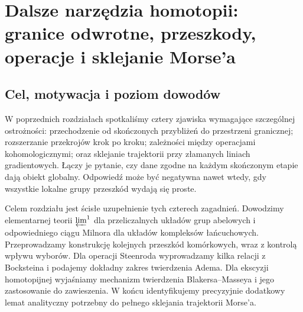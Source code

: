 \chapter{Dalsze narzędzia homotopii: granice odwrotne, przeszkody, operacje i sklejanie Morse'a}
\label{ch:xviii-domkniecie}

\section{Cel, motywacja i poziom dowodów}
W poprzednich rozdziałach spotkaliśmy cztery zjawiska wymagające
szczególnej ostrożności: przechodzenie od skończonych przybliżeń do
przestrzeni granicznej; rozszerzanie przekrojów krok po kroku; zależności
między operacjami kohomologicznymi; oraz sklejanie trajektorii przy
złamanych liniach gradientowych. Łączy je pytanie, czy dane zgodne na
każdym skończonym etapie dają obiekt globalny. Odpowiedź może być
negatywna nawet wtedy, gdy wszystkie lokalne grupy przeszkód wydają się
proste.

Celem rozdziału jest ścisłe uzupełnienie tych czterech zagadnień.
Dowodzimy elementarnej teorii $\varprojlim^1$ dla przeliczalnych
układów grup abelowych i odpowiedniego ciągu Milnora dla układów
kompleksów łańcuchowych. Przeprowadzamy konstrukcję kolejnych
przeszkód komórkowych, wraz z kontrolą wpływu wyborów. Dla operacji
Steenroda wyprowadzamy kilka relacji z Bocksteina i podajemy dokładny
zakres twierdzenia Adema. Dla ekscyzji homotopijnej wyjaśniamy
mechanizm twierdzenia Blakersa--Masseya i jego zastosowanie do
zawieszenia. W końcu identyfikujemy precyzyjnie dodatkowy lemat
analityczny potrzebny do pełnego sklejania trajektorii Morse'a.


